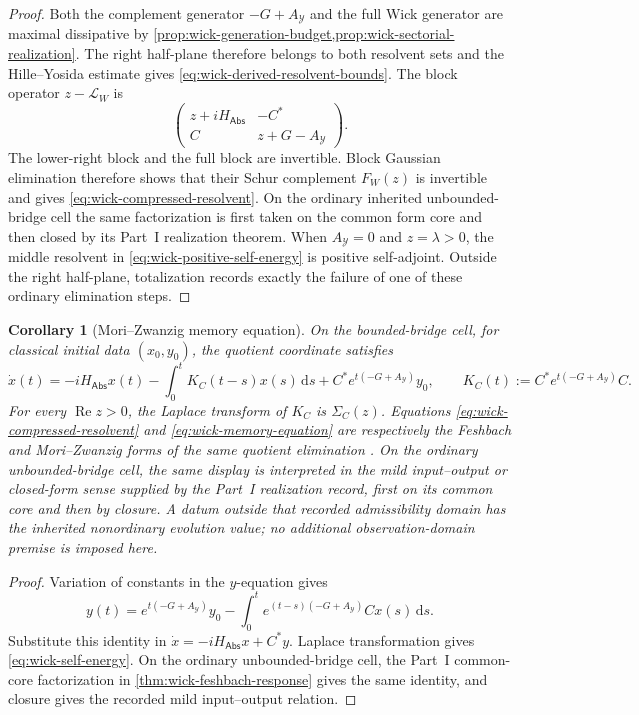 \documentclass[11pt]{article}
\numberwithin{section}{part}
\theoremstyle{plain}
\newtheorem{corollary}[corollary]{Corollary}
\theoremstyle{definition}
\theoremstyle{remark}
\newcommand{\dd}{\,\mathrm d}
\newcommand{\Abs}{\mathsf{Abs}}
\begin{document}
\begin{proof}
Both the complement generator \(-G+A_{\mathcal Y}\) and the full Wick
generator are maximal dissipative by
\cref{prop:wick-generation-budget,prop:wick-sectorial-realization}.  The
right half-plane therefore belongs to both resolvent sets and the
Hille--Yosida estimate gives \eqref{eq:wick-derived-resolvent-bounds}.
The block operator \(z-\mathcal L_W\) is
\[
 \begin{pmatrix}
  z+iH_{\Abs}&-C^*\\ C&z+G-A_{\mathcal Y}
 \end{pmatrix}.
\]
The lower-right block and the full block are invertible.  Block Gaussian
elimination therefore shows that their Schur complement \(F_W(z)\) is
invertible and gives \eqref{eq:wick-compressed-resolvent}.  On the ordinary
inherited unbounded-bridge cell the same factorization is first taken on the
common form core and then closed by its Part~I realization theorem.  When
\(A_{\mathcal Y}=0\) and \(z=\lambda>0\), the middle resolvent in
\eqref{eq:wick-positive-self-energy} is positive self-adjoint.  Outside the
right half-plane, totalization records exactly the failure of one of these
ordinary elimination steps.
\end{proof}

\begin{corollary}[Mori--Zwanzig memory equation]
\label{cor:wick-memory-equation}
On the bounded-bridge cell, for classical initial data
\((x_0,y_0)\), the quotient coordinate satisfies
\begin{equation}
 \label{eq:wick-memory-equation}
 \dot x(t)
 =-iH_{\Abs}x(t)
  -\int_0^tK_C(t-s)x(s)\dd s
  +C^*e^{t(-G+A_{\mathcal Y})}y_0,
 \qquad
 K_C(t):=C^*e^{t(-G+A_{\mathcal Y})}C.
\end{equation}
For every \(\operatorname{Re}z>0\), the Laplace transform of \(K_C\) is
\(\Sigma_C(z)\).  Equations
\eqref{eq:wick-compressed-resolvent} and
\eqref{eq:wick-memory-equation} are respectively the Feshbach and
Mori--Zwanzig forms of the same quotient elimination
\citep{Feshbach1958,Zwanzig1960,Mori1965}.
On the ordinary unbounded-bridge cell, the same display is interpreted in the
mild input--output or closed-form sense supplied by the Part~I realization
record, first on its common core and then by closure.  A datum outside that
recorded admissibility domain has the inherited nonordinary evolution value;
no additional observation-domain premise is imposed here.
\end{corollary}

\begin{proof}
Variation of constants in the \(y\)-equation gives
\[
 y(t)=e^{t(-G+A_{\mathcal Y})}y_0
 -\int_0^te^{(t-s)(-G+A_{\mathcal Y})}Cx(s)\dd s.
\]
Substitute this identity in \(\dot x=-iH_{\Abs}x+C^*y\).  Laplace
transformation gives \eqref{eq:wick-self-energy}.  On the ordinary
unbounded-bridge cell, the Part~I common-core factorization in
\cref{thm:wick-feshbach-response} gives the same identity, and closure gives
the recorded mild input--output relation.
\end{proof}
\end{document}
